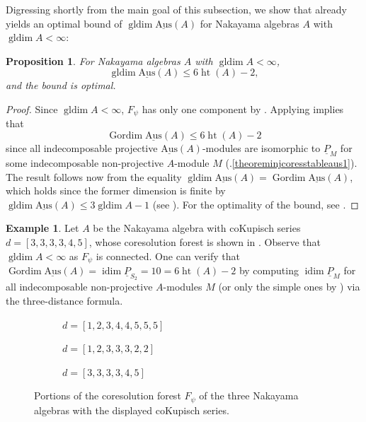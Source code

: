 \documentclass[a4paper]{amsart}
\newtheorem{proposition}[theorem]{Proposition}
\theoremstyle{definition}
\newtheorem{example}[theorem]{Example}
\theoremstyle{remark}
\numberwithin{equation}{theorem}
\newcommand{\sAus}{\operatorname{\underline{Aus}}}
\newcommand{\pstab}[1]{\underline{P}_{#1}}
\newcommand{\gordim}{\operatorname{Gordim}}
\newcommand{\height}{\operatorname{ht}}
\newcommand{\idim}{\operatorname{idim}}
\newcommand{\gldim}{\operatorname{gldim}}
\newcommand{\psiforest}{F_\psi}
\begin{document}
Digressing shortly from the main goal of this subsection, we show that  already yields an optimal bound of $ \gldim \sAus(A) $ for Nakayama algebras $ A $ with $ \gldim A < \infty $:
\begin{proposition}\label{prop:finite:height}
    For Nakayama algebras $A$ with $\gldim A < \infty$,
    \[
    \gldim\sAus(A)
    \leq 6\height(A) - 2,
    \]
    and the bound is optimal.
\end{proposition}
\begin{proof}

    Since $\gldim A < \infty$, $\psiforest$ has only one component by .
   Applying  implies that
    \[
        \gordim \sAus(A) \leq 6 \height(A) - 2
    \]
    since all indecomposable projective $ \sAus(A) $-modules are isomorphic to $ \pstab{M} $ for some indecomposable non-projective $ A $-module $ M $ (.\eqref{theoreminjcoresstableaus1}). The result follows now from the equality $ \gldim \sAus(A) = \gordim \sAus(A) $, which holds since the former dimension is finite by $ \gldim \sAus(A) \leq 3 \gldim A - 1 $ (see \cite[Proposition II.3.9]{AR}).
   For the optimality of the bound, see .
\end{proof}


\begin{example}\label{optimal.bound}
  Let $ A $ be the Nakayama algebra with coKupisch series $d=[3,3,3,3, \allowbreak 4,5]$, whose coresolution forest is shown in . 
  Observe that $ \gldim A < \infty $ as $ \psiforest $ is connected. 
  One can verify that $\gordim \sAus(A) = \idim \pstab{S_2} = 10 = 6\height(A) - 2$ by computing $\idim \pstab{M}$ for all indecomposable non-projective $A$-modules $M$ (or only the simple ones by ) via the three-distance formula.
\end{example}


  \begin{figure}[t]
    \begin{subfigure}[t]{0.32\textwidth}
      \centering
      
      \caption{$d = [1,2,3,4,4,5,5,5]$}
      \label{fig:coresforest-12344555}
  \end{subfigure}\hfill
    \begin{subfigure}[t]{0.32\textwidth}
      \centering
      
      \caption{$d = [1,2,3,3,3,2,2]$}
      \label{fig:coresforest-1233322}
    \end{subfigure}\hfill
    \begin{subfigure}[t]{0.32\textwidth}
      \centering
      
      \caption{$d = [3,3,3,3,4,5]$}
      \label{fig:coresforest-333345}
    \end{subfigure}
    \caption{Portions of the coresolution forest $\psiforest$ of the three Nakayama algebras with the displayed coKupisch series.}
    \label{fig:boundsexample2}
  \end{figure}
\end{document}
